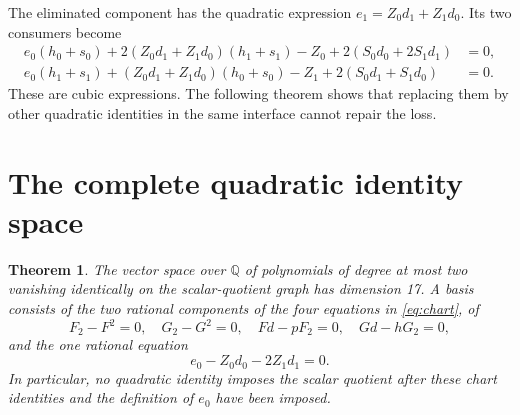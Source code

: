 \documentclass[11pt,a4paper]{article}
\newtheorem{theorem}{Theorem}[section]
\newcommand{\Q}{\mathbb Q}
\begin{document}
The eliminated component has the quadratic expression
$e_1=Z_0d_1+Z_1d_0$. Its two consumers become
\begin{align*}
 e_0(h_0+s_0)+2(Z_0d_1+Z_1d_0)(h_1+s_1)
       -Z_0+2(S_0d_0+2S_1d_1)&=0,\\
 e_0(h_1+s_1)+(Z_0d_1+Z_1d_0)(h_0+s_0)
       -Z_1+2(S_0d_1+S_1d_0)&=0.
\end{align*}
These are cubic expressions. The following theorem shows that replacing
them by other quadratic identities in the same interface cannot repair
the loss.

\section{The complete quadratic identity space}

\begin{theorem}\label{thm:space}
The vector space over $\Q$ of polynomials of degree at most two
vanishing identically on the scalar-quotient graph has dimension 17.
A basis consists of the two rational components of the four equations
in \eqref{eq:chart}, of
\[
 F_2-F^2=0,\quad G_2-G^2=0,\quad
 Fd-pF_2=0,\quad Gd-hG_2=0,
\]
and the one rational equation
\[
                     e_0-Z_0d_0-2Z_1d_1=0.
\]
In particular, no quadratic identity imposes the scalar quotient after
these chart identities and the definition of $e_0$ have been imposed.
\end{theorem}
\end{document}
